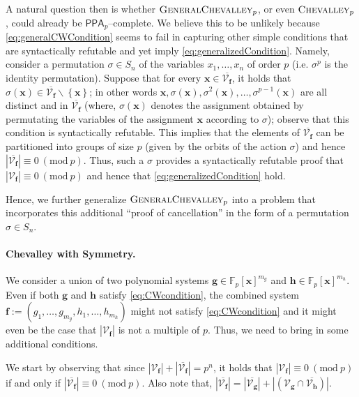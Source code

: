 \documentclass[10pt,a4paper]{article}
\theoremstyle{definition}
\theoremstyle{remark}
\newcommand{\inparen}[1]{\left ( #1 \right )}
\renewcommand{\mod}[1]{~\inparen{\mathrm{mod}~#1}}
\def\set#1{\left\{#1\right\}}
\newcommand{\bbF}{\ensuremath{\mathbb{F}}}
\newcommand{\calV}{\mathcal{V}}
\newcommand{\vecf}{\ensuremath{\boldsymbol{f}}}
\newcommand{\vecg}{\ensuremath{\boldsymbol{g}}}
\newcommand{\vech}{\ensuremath{\boldsymbol{h}}}
\newcommand{\vecx}{\ensuremath{\boldsymbol{x}}}
\newcommand{\class}[1]{\ensuremath{\mathsf{#1}}\xspace}
\newcommand{\PPA}{\class{PPA}}
\newcommand{\pnum}{p}
\newcommand{\Chevalley}{\ensuremath\textsc{Chevalley}}
\newcommand{\lChevalleyp}{\textsc{GeneralChevalley}_{\pnum}}
\newcommand{\lChevalley}{\textsc{GeneralChevalley}}
\begin{document}
A natural question then is whether $\lChevalley_p$, or even $\Chevalley_p$, could already be $\PPA_p$--complete. We believe this to be unlikely because \eqref{eq:generalCWCondition} seems to fail in capturing other simple conditions that are syntactically refutable and yet imply \eqref{eq:generalizedCondition}. Namely, consider a permutation $\sigma \in S_n$ of the variables $x_1, \ldots, x_n$ of order $p$ (i.e. $\sigma^p$ is the identity permutation). Suppose that for every $\vecx \in \overline{\calV_{\vecf}}$, it holds that $\sigma(\vecx) \in \overline{\calV_{\vecf}} \smallsetminus \set{\vecx}$; in other words $\vecx, \sigma(\vecx), \sigma^2(\vecx), \ldots, \sigma^{p-1}(\vecx)$ are all distinct and in $\overline{\calV_{\vecf}}$ (where, $\sigma(\vecx)$ denotes the assignment obtained by permutating the variables of the assignment $\vecx$ according to $\sigma$); observe that this condition is syntactically refutable. This implies that the elements of $\overline{\calV_{\vecf}}$ can be partitioned into groups of size $p$ (given by the orbits of the action $\sigma$) and hence $|\overline{\calV_{\vecf}}| \equiv 0 \mod{p}$. Thus, such a $\sigma$ provides a syntactically refutable proof that $|\calV_{\vecf}| \equiv 0 \mod{p}$ and hence that \eqref{eq:generalizedCondition} hold.

Hence, we further generalize 
$\lChevalleyp$ into a problem that incorporates this additional ``proof of cancellation'' in the form of a permutation $\sigma \in S_n$.

\paragraph{Chevalley with Symmetry.}
We consider a union of two polynomial systems $\vecg  \in \bbF_p[\vecx]^{m_g}$ and $\vech \in \bbF_p[\vecx]^{m_h}$. Even if both $\vecg$ and
$\vech$ satisfy \eqref{eq:CWcondition}, the combined system $\vecf :=
(g_1, \ldots, g_{m_g}, h_1, \ldots, h_{m_h})$ might not satisfy \eqref{eq:CWcondition}
and it might even be the case that $|\calV_{\vecf}|$ is not a multiple of $p$. Thus, we need to bring in some additional conditions.

We start by observing that since $|\calV_{\vecf}| + |\overline{\calV_{\vecf}}| = p^n$, it holds that $|\calV_{\vecf}| \equiv 0 \mod{p}$ if and only if $|\overline{\calV_{\vecf}}| \equiv 0 \mod{p}$. Also note that, $|\overline{\calV_{\vecf}}| = |\overline{\calV_{\vecg}}| + |(\calV_{\vecg} \cap \overline{\calV_{\vech}})|$.
\end{document}
